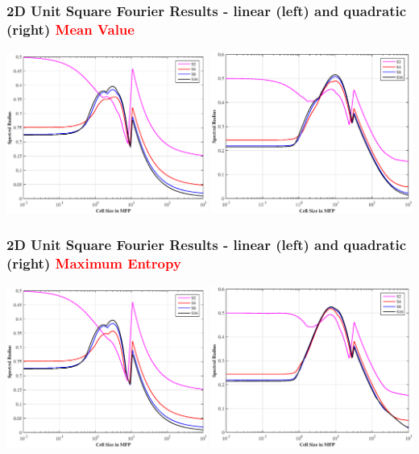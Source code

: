 \documentclass[compress,10pt]{beamer}
\newcommand{\tcr}[1]{\textcolor{red}{#1}}
\begin{document}
\begin{frame}[t]
{}
{
\frametitle{\small 2D Unit Square Fourier Results - linear (left) and quadratic (right) \tcr{Mean Value}}
\vspace{1cm}
\includegraphics[width=0.495\textwidth]{images/SI_MIP_quad_C=4_UMV1_LS.eps}
\includegraphics[width=0.495\textwidth]{images/SI_MIP_quad_C=4_UMV2_LS.eps}
}
{
\frametitle{\small 2D Unit Square Fourier Results - linear (left) and quadratic (right) \tcr{Maximum Entropy}}
\vspace{1cm}
\includegraphics[width=0.495\textwidth]{images/SI_MIP_quad_C=4_MAXENT1_LS.eps}
\includegraphics[width=0.495\textwidth]{images/SI_MIP_quad_C=4_UMAXENT2_LS.eps}
}
\end{frame}
\end{document}

